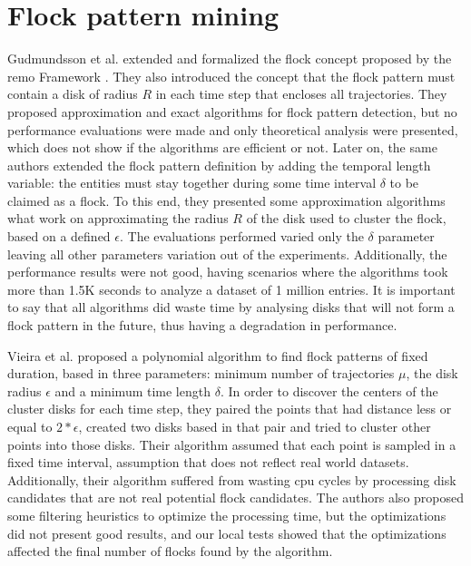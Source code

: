 \section{Flock pattern mining}
\label{sec:rel_flocks}
Gudmundsson et al. \citep{gudefficient} \citep{gudlongest} extended and formalized the flock concept proposed by the
\ac{remo} Framework \citep{remo}. They also introduced the concept that the flock pattern must contain a disk of radius
$R$ in each time step that encloses all trajectories. They proposed approximation and exact algorithms for flock pattern
detection, but no performance evaluations were made and only theoretical analysis were presented, which does not show if
the algorithms are efficient or not. Later on, the same authors \citep{gudlongest} extended the flock pattern definition
by adding the temporal length variable: the entities must stay together during some time interval $\delta$ to be claimed
as a flock. To this end, they presented some approximation algorithms what work on approximating the radius $R$ of the
disk used to cluster the flock, based on a defined $\epsilon$. The evaluations performed \citep{gudlongest} varied only
the $\delta$ parameter leaving all other parameters variation out of the experiments. Additionally, the performance
results were not good, having scenarios where the algorithms took more than 1.5K seconds to analyze a dataset of 1
million entries. It is important to say that all algorithms did waste time by analysing disks that will not form a flock
pattern in the future, thus having a degradation in performance.

Vieira et al. \citep{vieira} proposed a polynomial algorithm to find flock patterns of fixed duration, based in three
parameters: minimum number of trajectories $\mu$, the disk radius $\epsilon$ and a minimum time length $\delta$.  In
order to discover the centers of the cluster disks for each time step, they paired the points that had distance less or
equal to $2*\epsilon$, created two disks based in that pair and tried to cluster other points into those disks. Their
algorithm assumed that each point is sampled in a fixed time interval, assumption that does not reflect real world
datasets. Additionally, their algorithm suffered from wasting \ac{cpu} cycles by processing disk candidates that are not
real potential flock candidates. The authors also proposed some filtering heuristics to optimize the processing time,
but the optimizations did not present good results, and our local tests showed that the optimizations affected the final
number of flocks found by the algorithm.

